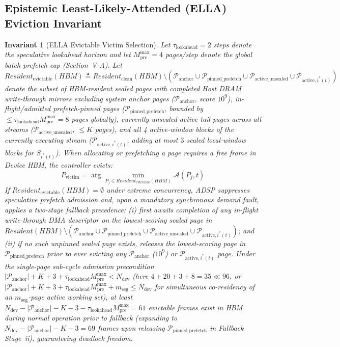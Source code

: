 \documentclass[conference,10pt]{IEEEtran}
\newtheorem{invariant}{Invariant}
\begin{document}
\subsection{Epistemic Least-Likely-Attended (ELLA) Eviction Invariant}
\begin{invariant}[ELLA Evictable Victim Selection]
Let $\tau_{\text{lookahead}} = 2$ steps denote the speculative lookahead horizon and let $M_{\text{pre}}^{\max} = 4$ pages/step denote the global batch prefetch cap (Section~V-A). Let $\textit{Resident}_{\text{evictable}}(\textit{HBM}) \triangleq \textit{Resident}_{\text{clean}}(\textit{HBM}) \setminus (\mathcal{P}_{\text{anchor}} \cup \mathcal{P}_{\text{pinned\_prefetch}} \cup \mathcal{P}_{\text{active\_unsealed}} \cup \mathcal{P}_{\text{active}, i^*(t)})$ denote the subset of HBM-resident sealed pages with completed Host DRAM write-through mirrors excluding system anchor pages ($\mathcal{P}_{\text{anchor}}$, score $10^9$), in-flight/admitted prefetch-pinned pages ($\mathcal{P}_{\text{pinned\_prefetch}}$, bounded by $\le \tau_{\text{lookahead}} M_{\text{pre}}^{\max} = 8$ pages globally), currently unsealed active tail pages across all streams ($\mathcal{P}_{\text{active\_unsealed}}$, $\le K$ pages), and all 4 active-window blocks of the currently executing stream ($\mathcal{P}_{\text{active}, i^*(t)}$, adding at most $3$ sealed local-window blocks for $S_{i^*(t)}$). When allocating or prefetching a page requires a free frame in Device HBM, the controller evicts:
\begin{equation}
\label{eq:victim_select}
P_{\text{victim}} = \arg\min_{P_j \in \textit{Resident}_{\text{evictable}}(\textit{HBM})} \mathcal{A}(P_j, t)
\end{equation}
If $\textit{Resident}_{\text{evictable}}(\textit{HBM}) = \emptyset$ under extreme concurrency, ADSP suppresses speculative prefetch admission and, upon a mandatory synchronous demand fault, applies a two-stage fallback precedence: (i) first awaits completion of any in-flight write-through DMA descriptor on the lowest-scoring sealed page in $\textit{Resident}(\textit{HBM}) \setminus (\mathcal{P}_{\text{anchor}} \cup \mathcal{P}_{\text{pinned\_prefetch}} \cup \mathcal{P}_{\text{active\_unsealed}} \cup \mathcal{P}_{\text{active}, i^*(t)})$; and (ii) if no such unpinned sealed page exists, releases the lowest-scoring page in $\mathcal{P}_{\text{pinned\_prefetch}}$ prior to ever evicting any $\mathcal{P}_{\text{anchor}}$ ($10^9$) or $\mathcal{P}_{\text{active}, i^*(t)}$ page. Under the single-page sub-cycle admission precondition $|\mathcal{P}_{\text{anchor}}| + K + 3 + \tau_{\text{lookahead}}M_{\text{pre}}^{\max} < N_{\text{dev}}$ (here $4 + 20 + 3 + 8 = 35 \ll 96$, or $|\mathcal{P}_{\text{anchor}}| + K + 3 + \tau_{\text{lookahead}}M_{\text{pre}}^{\max} + m_{\text{seg}} \le N_{\text{dev}}$ for simultaneous co-residency of an $m_{\text{seg}}$-page active working set), at least $N_{\text{dev}} - |\mathcal{P}_{\text{anchor}}| - K - 3 - \tau_{\text{lookahead}}M_{\text{pre}}^{\max} = 61$ evictable frames exist in HBM during normal operation prior to fallback (expanding to $N_{\text{dev}} - |\mathcal{P}_{\text{anchor}}| - K - 3 = 69$ frames upon releasing $\mathcal{P}_{\text{pinned\_prefetch}}$ in Fallback Stage~ii), guaranteeing deadlock freedom.

\end{invariant}
\end{document}
